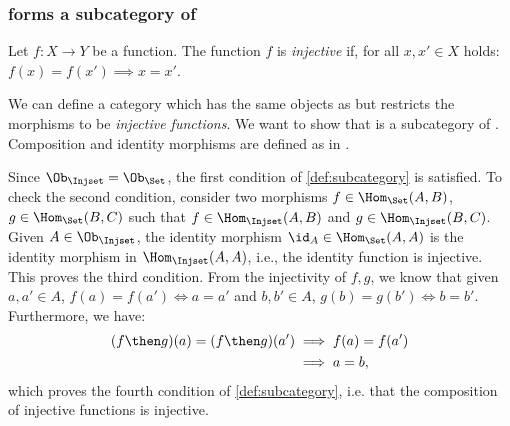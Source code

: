\subsubsection{\Injset forms a subcategory of \Set}
\begin{definition}\label{def:injective-function}
Let $f\colon X\to Y$ be a function. The function $f$ is \emph{injective} if, for all $x,x'\in X$ holds: $f(x)=f(x')\implies x=x'$.
\end{definition}


\begin{example}
We can define a category \Injset which has the same objects as \Set but restricts the morphisms to be \emph{injective functions}.
We want to show that \Injset is a subcategory of \Set. Composition and identity morphisms are defined as in \Set.

Since $\Ob_{\Injset}=\Ob_{\Set}$, the first condition of \cref{def:subcategory} is satisfied. To check the second condition, consider two morphisms $f\in \Hom_\Set(A,B)$, $g\in \Hom_\Set(B,C)$ such that $f\in \Hom_\Injset(A,B)$ and $g\in \Hom_\Injset(B,C)$. Given $A\in \Ob_{\Injset}$, the identity morphism $\id_A\in \Hom_{\Set}(A,A)$ is the identity morphism in $\Hom_{\Injset}(A,A)$, i.e., the identity function is injective. This proves the third condition. From the injectivity of $f,g$, we know that given $a,a'\in A$, $f(a)=f(a') \Leftrightarrow a=a'$ and $b,b'\in A$, $g(b)=g(b') \Leftrightarrow b=b'$. Furthermore, we have:
\begin{equation*}
    \begin{aligned}
    (f\then g)(a)=(f\then g)(a')&\implies f(a)=f(a')\\
    &\implies a=b,
    \end{aligned}
\end{equation*}
which proves the fourth condition of \cref{def:subcategory}, i.e. that the composition of injective functions is injective.
\end{example}



